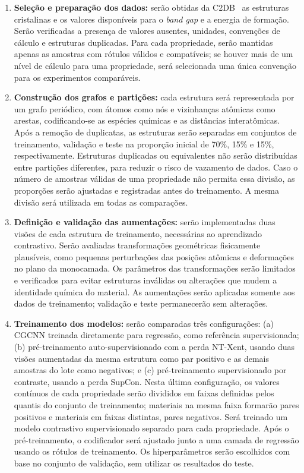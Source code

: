 \begin{enumerate}
    \item \textbf{Seleção e preparação dos dados:} serão obtidas da C2DB~\cite{haastrup2018computational,gantenbein2021c2db} as estruturas cristalinas e os valores disponíveis para o \textit{band gap} e a energia de formação. Serão verificadas a presença de valores ausentes, unidades, convenções de cálculo e estruturas duplicadas. Para cada propriedade, serão mantidas apenas as amostras com rótulos válidos e compatíveis; se houver mais de um nível de cálculo para uma propriedade, será selecionada uma única convenção para os experimentos comparáveis.

    \item \textbf{Construção dos grafos e partições:} cada estrutura será representada por um grafo periódico, com átomos como nós e vizinhanças atômicas como arestas, codificando-se as espécies químicas e as distâncias interatômicas. Após a remoção de duplicatas, as estruturas serão separadas em conjuntos de treinamento, validação e teste na proporção inicial de 70\%, 15\% e 15\%, respectivamente. Estruturas duplicadas ou equivalentes não serão distribuídas entre partições diferentes, para reduzir o risco de vazamento de dados. Caso o número de amostras válidas de uma propriedade não permita essa divisão, as proporções serão ajustadas e registradas antes do treinamento. A mesma divisão será utilizada em todas as comparações.

    \item \textbf{Definição e validação das aumentações:} serão implementadas duas visões de cada estrutura de treinamento, necessárias ao aprendizado contrastivo. Serão avaliadas transformações geométricas fisicamente plausíveis, como pequenas perturbações das posições atômicas e deformações no plano da monocamada. Os parâmetros das transformações serão limitados e verificados para evitar estruturas inválidas ou alterações que mudem a identidade química do material. As aumentações serão aplicadas somente aos dados de treinamento; validação e teste permanecerão sem alterações.

    \item \textbf{Treinamento dos modelos:} serão comparadas três configurações: (a) CGCNN treinada diretamente para regressão, como referência supervisionada; (b) pré-treinamento auto-supervisionado com a perda NT-Xent, usando duas visões aumentadas da mesma estrutura como par positivo e as demais amostras do lote como negativos; e (c) pré-treinamento supervisionado por contraste, usando a perda SupCon. Nesta última configuração, os valores contínuos de cada propriedade serão divididos em faixas definidas pelos quantis do conjunto de treinamento; materiais na mesma faixa formarão pares positivos e materiais em faixas distintas, pares negativos. Será treinado um modelo contrastivo supervisionado separado para cada propriedade. Após o pré-treinamento, o codificador será ajustado junto a uma camada de regressão usando os rótulos de treinamento. Os hiperparâmetros serão escolhidos com base no conjunto de validação, sem utilizar os resultados do teste.


\end{enumerate}
